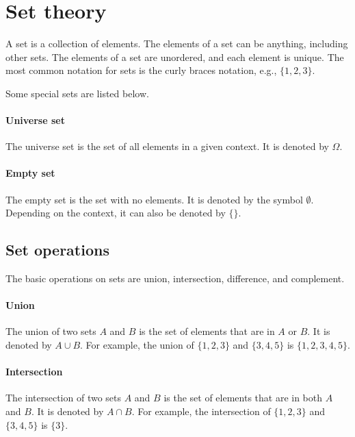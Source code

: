 
\section{Set theory}

A set is a collection of elements.  The elements of a set can be anything, including
other sets.  The elements of a set are unordered, and each element is unique.  The
most common notation for sets is the curly braces notation, e.g., $\{1, 2, 3\}$.

Some special sets are listed below.

\paragraph{Universe set}  The universe set is the set of all elements in a given context.
It is denoted by $\Omega$.

\paragraph{Empty set}  The empty set is the set with no elements.  It is denoted by
the symbol $\emptyset$.  Depending on the context, it can also be denoted by $\{\}$.

\subsection{Set operations}

The basic operations on sets are union, intersection, difference, and complement.

\paragraph{Union}  The union of two sets $A$ and $B$ is the set of elements that are in
$A$ or $B$.  It is denoted by $A \cup B$.  For example, the union of $\{1, 2, 3\}$ and
$\{3, 4, 5\}$ is $\{1, 2, 3, 4, 5\}$.

\paragraph{Intersection}  The intersection of two sets $A$ and $B$ is the set of elements
that are in both $A$ and $B$.  It is denoted by $A \cap B$.  For example, the intersection
of $\{1, 2, 3\}$ and $\{3, 4, 5\}$ is $\{3\}$.

